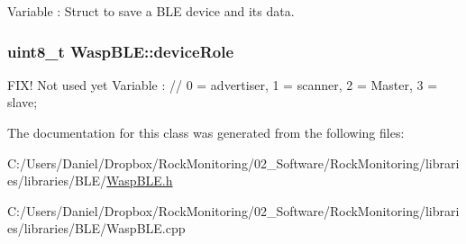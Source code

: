 Variable \+: Struct to save a B\+LE device and its data. 
\subsubsection[{\texorpdfstring{device\+Role}{deviceRole}}]{\setlength{\rightskip}{0pt plus 5cm}uint8\+\_\+t Wasp\+B\+L\+E\+::device\+Role}\hypertarget{class_wasp_b_l_e_a52ffe5e340fa3f94336fddc227440132}{}\label{class_wasp_b_l_e_a52ffe5e340fa3f94336fddc227440132}
F\+I\+X! Not used yet Variable \+: // 0 = advertiser, 1 = scanner, 2 = Master, 3 = slave; 

The documentation for this class was generated from the following files\+:\begin{DoxyCompactItemize}
\item 
C\+:/\+Users/\+Daniel/\+Dropbox/\+Rock\+Monitoring/02\+\_\+\+Software/\+Rock\+Monitoring/libraries/libraries/\+B\+L\+E/\hyperlink{_wasp_b_l_e_8h}{Wasp\+B\+L\+E.\+h}\item 
C\+:/\+Users/\+Daniel/\+Dropbox/\+Rock\+Monitoring/02\+\_\+\+Software/\+Rock\+Monitoring/libraries/libraries/\+B\+L\+E/Wasp\+B\+L\+E.\+cpp\end{DoxyCompactItemize}
